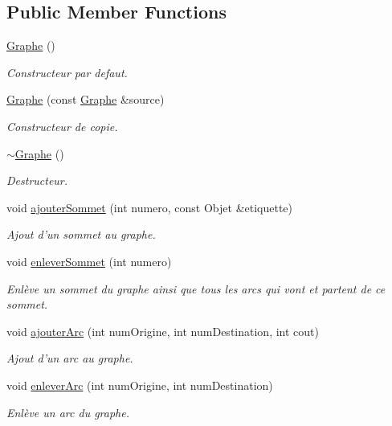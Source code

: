 \subsection*{Public Member Functions}
\begin{DoxyCompactItemize}
\item 
\hyperlink{class_graphe_adb8383352920cc36b73929998c90db53}{Graphe} ()
\begin{DoxyCompactList}\small\item\em Constructeur par defaut. \end{DoxyCompactList}\item 
\hyperlink{class_graphe_ab92769924f1e76dd5e3872c1e85b229c}{Graphe} (const \hyperlink{class_graphe}{Graphe} \&source)
\begin{DoxyCompactList}\small\item\em Constructeur de copie. \end{DoxyCompactList}\item 
\hyperlink{class_graphe_af33551f1cd40e11d7a1983628d3d5641}{$\sim$Graphe} ()
\begin{DoxyCompactList}\small\item\em Destructeur. \end{DoxyCompactList}\item 
void \hyperlink{class_graphe_a398d9e6777b28dd6a5ee1572f5128498}{ajouterSommet} (int numero, const Objet \&etiquette)
\begin{DoxyCompactList}\small\item\em Ajout d'un sommet au graphe. \end{DoxyCompactList}\item 
void \hyperlink{class_graphe_a70470e6b8b0ea59097c1a9a96e631f45}{enleverSommet} (int numero)
\begin{DoxyCompactList}\small\item\em Enlève un sommet du graphe ainsi que tous les arcs qui vont et partent de ce sommet. \end{DoxyCompactList}\item 
void \hyperlink{class_graphe_a3324e98fb20348bff3ffec78675b0ce5}{ajouterArc} (int numOrigine, int numDestination, int cout)
\begin{DoxyCompactList}\small\item\em Ajout d'un arc au graphe. \end{DoxyCompactList}\item 
void \hyperlink{class_graphe_aa97c99653199bf922b44e07de8be0a99}{enleverArc} (int numOrigine, int numDestination)
\begin{DoxyCompactList}\small\item\em Enlève un arc du graphe. \end{DoxyCompactList}\item 

\end{DoxyCompactItemize}
